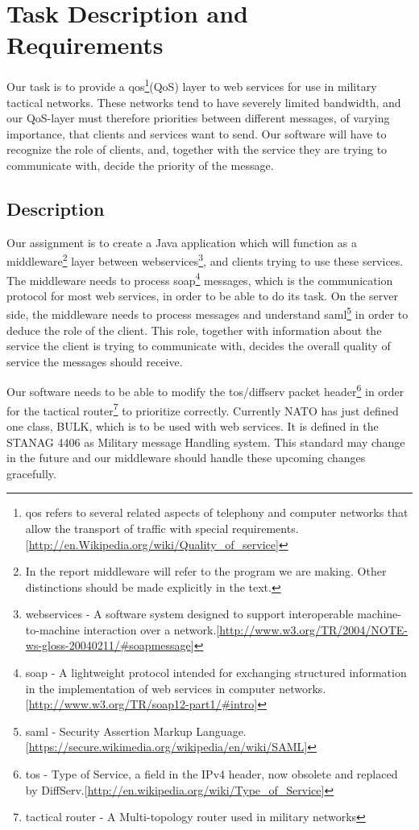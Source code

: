 \section{Task Description and Requirements}\label{Task Description and Requirements} 

    Our task is to provide a \gls{qos}\footnote{\gls{qos} refers to several related aspects of telephony and computer networks that allow the transport of traffic with special requirements.[\url{http://en.Wikipedia.org/wiki/Quality_of_service}]}(QoS) layer to web services for use in military tactical networks. These networks tend to have severely limited bandwidth, and our QoS-layer must therefore priorities between different messages, of varying importance, that clients and services want to send. Our software will have to recognize the role of clients, and, together with the service they are trying to communicate with, decide the priority of the message.
    
    \subsection{Description}\label{Description}        
    Our assignment is to create a Java application which will function as a \gls{middleware}\footnote{In the report \gls{middleware} will refer to the program we are making. Other distinctions should be made explicitly in the text.} layer between \glspl{webservice}\footnote{\glspl{webservice} - A software system designed to support interoperable machine-to-machine interaction over a network.[\url{http://www.w3.org/TR/2004/NOTE-ws-gloss-20040211/\#soapmessage}]}, and clients trying to use these services. The middleware needs to process \gls{soap}\footnote{\gls{soap} - A lightweight protocol intended for exchanging structured information in the implementation of web services in computer networks.[\url{http://www.w3.org/TR/soap12-part1/\#intro}]} messages, which is the communication protocol for most web services, in order to be able to do its task. On the server side, the middleware needs to process messages and understand \gls{saml}\footnote{\gls{saml} - Security Assertion Markup Language.[\url{https://secure.wikimedia.org/wikipedia/en/wiki/SAML}]} in order to deduce the role of the client. This role, together with information about the service the client is trying to communicate with, decides the overall quality of service the messages should receive. 

    Our software needs to be able to modify the \gls{tos}/\gls{diffserv} \gls{packet} header\footnote{\gls{tos} - Type of Service, a field in the IPv4 header, now obsolete and replaced by DiffServ.[\url{http://en.wikipedia.org/wiki/Type_of_Service}]} in order for the \gls{tactical router}\footnote{\Gls{tactical router} - A Multi-topology router used in military networks} to prioritize correctly. Currently NATO has just defined one class, BULK, which is to be used with web services. It is defined in the STANAG 4406 as Military message Handling system. This standard may change in the future and our middleware should handle these upcoming changes gracefully.

